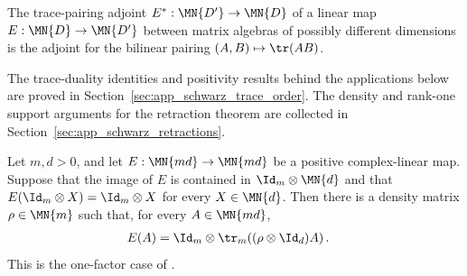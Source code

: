 \begin{definition}\label{def:trace_pairing_adjoint}
    \leanok
    The trace-pairing adjoint $E^* : \MN{D'} \to \MN{D}$ of a linear map
    $E : \MN{D} \to \MN{D'}$ between matrix algebras of possibly different
    dimensions is the adjoint for the bilinear pairing
    $(A,B)\mapsto \tr(AB)$.
\end{definition}

The trace-duality identities and positivity results behind the applications
below are proved in Section~\ref{sec:app_schwarz_trace_order}. The density and
rank-one support arguments for the retraction theorem are collected in
Section~\ref{sec:app_schwarz_retractions}.

\begin{theorem}
    \label{thm:positive_retraction_one_matrix_factor}
    \leanok
    Let $m,d>0$, and let
    $E:\MN{md}\to\MN{md}$ be a positive complex-linear map. Suppose that the
    image of $E$ is contained in $\Id_m\otimes\MN{d}$ and that
    $E(\Id_m\otimes X)=\Id_m\otimes X$ for every $X\in\MN{d}$. Then there is
    a density matrix $\rho\in\MN{m}$ such that, for every $A\in\MN{md}$,
    \begin{align}
        E(A)
         & =\Id_m\otimes
        \tr_m\!\left((\rho\otimes\Id_d)A\right).
        \label{eq:schwarz_positive_retraction_factor}
    \end{align}
    This is the one-factor case of
    \cite[Proposition~1.5 and Equation~(1.40)]{Wolf2012Quantum}.
\end{theorem}


